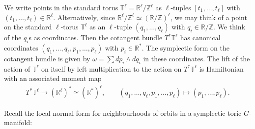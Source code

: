 \documentclass[pdftex]{sigma}
\numberwithin{equation}{section}
\begin{document}
We write points in the standard torus ${\mathbb T}^\ell = {\mathbb R}^\ell/{\mathbb Z}^\ell$ as
$\ell$-tuples $[t_1, \ldots, t_\ell]$
with $(t_1, \ldots, t_\ell) \in {\mathbb R}^\ell$.
Alternatively, since ${\mathbb R}^\ell/{\mathbb Z}^\ell \simeq ({\mathbb R}/{\mathbb Z})^\ell$,
we may think of
a point on the standard $\ell$-torus ${\mathbb T}^\ell $ as an $\ell$-tuple
$(q_1,\ldots, q_\ell)$ with $q_i \in {\mathbb R}/{\mathbb Z}$.  We think of the $q_i$s as
coordinates.  Then the cotangent bundle $T^*{\mathbb T}^\ell$ has canonical
coordinates $(q_1, \ldots, q_\ell, p_1,\ldots, p_\ell)$
with $p_i\in {\mathbb R}^*$.
The symplectic form on the cotangent bundle is given by
$\omega = \sum dp_i \wedge dq_i$ in these coordinates.
The lift of the action of ${\mathbb T}^\ell$ on itself by left multiplication
to the action on
$T^*{\mathbb T}^\ell$ is Hamiltonian with an associated moment map
\begin{gather*}
T^*{\mathbb T}^\ell \to ({\mathbb R}^\ell)^* \simeq ({\mathbb R}^*)^\ell, \qquad
(q_1,\ldots, q_\ell, p_1,\ldots, p_\ell)\mapsto (p_1,\ldots,  p_\ell).
\end{gather*}


Recall the local normal form for neighbourhoods of orbits
in a symplectic toric $G$-manifold:
\end{document}
